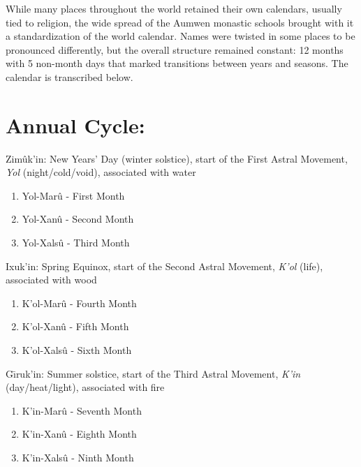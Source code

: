 \documentclass[12pt]{article}
\begin{document}
\maketitle
	
While many places throughout the world retained their own calendars, usually tied to religion, the wide spread of the Aumwen monastic schools brought with it a standardization of the world calendar. Names were twisted in some places to be pronounced differently, but the overall structure remained constant: 12 months with 5 non-month days that marked transitions between years and seasons. The calendar is transcribed below.
\section{Annual Cycle:}

Zim\^{u}k'in: New Years' Day (winter solstice), start of the First Astral Movement, \textit{Yol} (night/cold/void), associated with water

\begin{enumerate}
	
	\item Yol-Mar\^{u} - First Month 
	
	\item Yol-Xan\^{u} - Second Month
	
	\item Yol-Xals\^{u} - Third Month

\end{enumerate}
	
Ixuk'in: Spring Equinox, start of the Second Astral Movement, \textit{K'ol} (life), associated with wood
	
\begin{enumerate}[resume]	

	\item K'ol-Mar\^{u} - Fourth Month 

	\item K'ol-Xan\^{u} - Fifth Month
	
	\item K'ol-Xals\^{u} - Sixth Month
\end{enumerate}

G\={\i}ruk'in: Summer solstice, start of the Third Astral Movement, \textit{K'in} (day/heat/light), associated with fire

\begin{enumerate}[resume]	

	\item K'in-Mar\^{u} - Seventh Month 

	\item K'in-Xan\^{u} - Eighth Month
	
	\item K'in-Xals\^{u} - Ninth Month
\end{enumerate}
\end{document}
